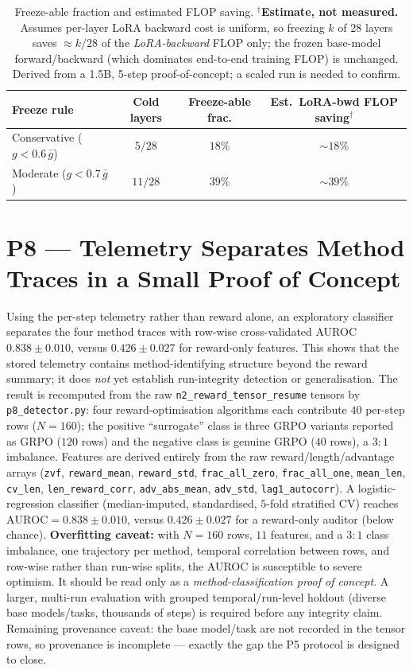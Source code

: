 \begin{table}[h]
\centering
\small
\begin{tabular}{lccc}
\toprule
Freeze rule & Cold layers & Freeze-able frac. & Est.\ LoRA-bwd FLOP saving$^{\dagger}$ \\
\midrule
Conservative ($g<0.6\,\bar{g}$) & $5/28$  & $18\%$ & $\sim\!18\%$ \\
Moderate ($g<0.7\,\bar{g}$)     & $11/28$ & $39\%$ & $\sim\!39\%$ \\
\bottomrule
\end{tabular}
\caption{Freeze-able fraction and estimated FLOP saving. $^{\dagger}$\textbf{Estimate,
not measured.} Assumes per-layer LoRA backward cost is uniform, so freezing $k$ of
$28$ layers saves $\approx k/28$ of the \emph{LoRA-backward} FLOP only; the frozen
base-model forward/backward (which dominates end-to-end training FLOP) is unchanged.
Derived from a 1.5B, 5-step proof-of-concept; a scaled run is needed to confirm.}
\label{tab:p1-freeze-estimate}
\end{table}

\section{P8 --- Telemetry Separates Method Traces in a Small Proof of Concept}
Using the per-step telemetry rather than reward alone, an exploratory classifier
separates the four method traces with row-wise cross-validated AUROC $0.838\pm0.010$,
versus $0.426\pm0.027$ for reward-only features. This shows that the stored telemetry
contains method-identifying structure beyond the reward summary; it does \emph{not}
yet establish run-integrity detection or generalisation. The result is
recomputed from the raw \texttt{n2\_reward\_tensor\_resume} tensors by
\texttt{p8\_detector.py}: four reward-optimisation algorithms each contribute $40$
per-step rows ($N=160$); the positive ``surrogate'' class is three GRPO variants
reported as GRPO ($120$ rows) and the negative class is genuine GRPO ($40$ rows), a
$3{:}1$ imbalance. Features are derived entirely from the raw reward/length/advantage
arrays (\texttt{zvf}, \texttt{reward\_mean}, \texttt{reward\_std},
\texttt{frac\_all\_zero}, \texttt{frac\_all\_one}, \texttt{mean\_len},
\texttt{cv\_len}, \texttt{len\_reward\_corr}, \texttt{adv\_abs\_mean},
\texttt{adv\_std}, \texttt{lag1\_autocorr}). A logistic-regression classifier
(median-imputed, standardised, $5$-fold stratified CV) reaches
$\mathrm{AUROC}=0.838\pm0.010$, versus $0.426\pm0.027$ for a reward-only auditor
(below chance). \textbf{Overfitting caveat:} with $N=160$ rows, $11$ features, and a
$3{:}1$ class imbalance, one trajectory per method, temporal correlation between rows,
and row-wise rather than run-wise splits, the AUROC is susceptible to severe optimism.
It should be read only as a \emph{method-classification proof of concept}. A larger,
multi-run evaluation with grouped temporal/run-level holdout (diverse base
models/tasks, thousands of steps) is required before any integrity claim. Remaining provenance caveat: the base
model/task are not recorded in the tensor rows, so provenance is incomplete --- exactly
the gap the P5 protocol is designed to close.

